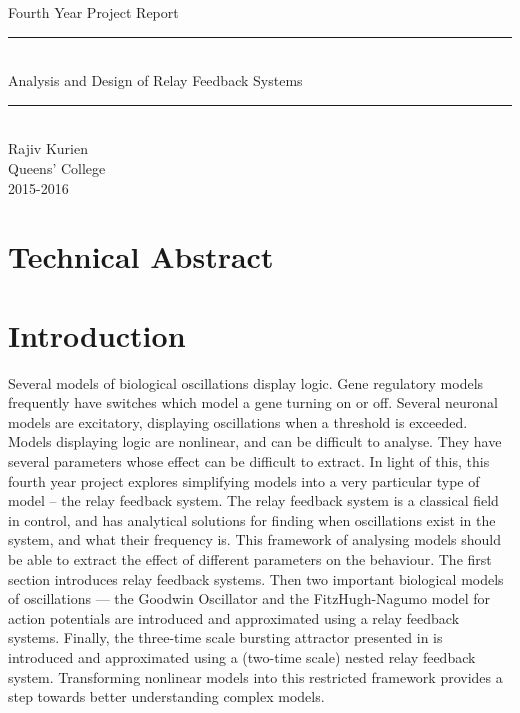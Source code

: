 \documentclass[a4paper, 12pt]{article}
\begin{document}
\begin{titlepage}
 \vspace*{\fill}
	\begin{center}
		{\Large Fourth Year Project Report} \vspace{0.25cm}
		\rule{\textwidth}{.1pt} \\[0.25cm]
		{\Huge Analysis and Design of Relay Feedback Systems }\\%
		\vspace{0.25cm} 
		\rule{\textwidth}{.1pt} \\[0.5cm]
		\Large{
	Rajiv Kurien\\Queens' College\\2015-2016
		}
	\end{center}
 \vspace*{\fill}
\end{titlepage}
\section*{Technical Abstract}
\newpage
\tableofcontents
\newpage
\section{Introduction}
Several models of biological oscillations display logic. Gene regulatory models frequently have switches which model a gene turning on or off. Several neuronal models are excitatory, displaying oscillations when a threshold is exceeded. Models displaying logic are nonlinear, and can be difficult to analyse. They have several parameters whose effect can be difficult to extract. In light of this, this fourth year project explores simplifying models into a very particular type of model -- the relay feedback system. The relay feedback system is a classical field in control, and has analytical solutions for finding when oscillations exist in the system, and what their frequency is. This framework of analysing models should be able to extract the effect of different parameters on the behaviour. 
\newline
The first section introduces relay feedback systems. Then two important biological models of oscillations --- the Goodwin Oscillator and the FitzHugh-Nagumo model for action potentials are introduced and approximated using a relay feedback systems. Finally, the three-time scale bursting attractor presented in \cite{franci} is introduced and approximated using a (two-time scale) nested relay feedback system.
\newline 
Transforming nonlinear models into this restricted framework provides a step towards better understanding complex models.
\end{document}
